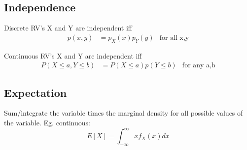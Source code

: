\documentclass[12pt]{amsart}
\begin{document}
\subsection{Independence}
Discrete RV's X and Y are independent iff
\begin{align*}
p(x,y) &= p_X(x)p_Y(y) & \text{for all x,y}
\end{align*}

Continuous RV's X and Y are independent iff
\begin{align*}
P(X \leq a, Y \leq b) &= P(X\leq a)p(Y \leq b) & \text{for any a,b}
\end{align*}

\subsection{Expectation}
Sum/integrate the variable times the marginal density for all possible values of the variable. Eg. continuous:
\[
E[X] = \int_{-\infty}^{\infty} xf_X(x) dx
\]
\end{document}
